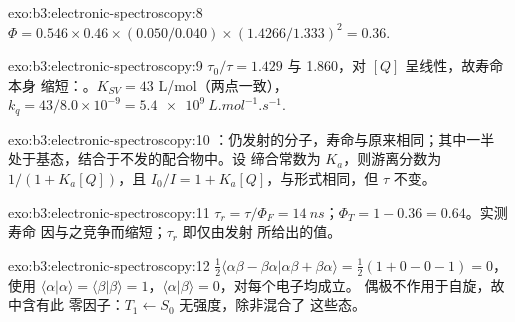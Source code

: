 \begin{solution}{exo:b3:electronic-spectroscopy:8}
$\Phi = 0.546 \times 0.46 \times (0.050/0.040) \times (1.4266/1.333)^2 = 0.36$.
\end{solution}

\begin{solution}{exo:b3:electronic-spectroscopy:9}
$\tau_0/\tau = 1.429$ 与 1.860，对 $[Q]$ 呈线性，故寿命本身
缩短：。$K_{SV} = 43$ L/mol（两点一致），$k_q = 43/8.0
\times 10^{-9} = \qty{5.4e9}{L.mol^{-1}.s^{-1}}$.
\end{solution}

\begin{solution}{exo:b3:electronic-spectroscopy:10}
：仍发射的分子，寿命与原来相同；其中一半
处于基态，结合于不发的配合物中。设
缔合常数为 $K_a$，则游离分数为 $1/(1 + K_a[Q])$，且 $I_0/I = 1 +
K_a[Q]$，与形式相同，但 $\tau$ 不变。
\end{solution}

\begin{solution}{exo:b3:electronic-spectroscopy:11}
$\tau_r = \tau/\Phi_F = \qty{14}{ns}$；$\Phi_T = 1 - 0.36 = 0.64$。实测寿命
因与之竞争而缩短；$\tau_r$ 即仅由发射
所给出的值。
\end{solution}

\begin{solution}{exo:b3:electronic-spectroscopy:12}
$\frac12\langle\alpha\beta - \beta\alpha|\alpha\beta + \beta\alpha\rangle = \frac12(1 + 0 - 0 - 1) = 0$，使用
$\langle\alpha|\alpha\rangle = \langle\beta|\beta\rangle = 1$，$\langle\alpha|\beta\rangle = 0$，对每个电子均成立。
偶极不作用于自旋，故中含有此
零因子：$T_1 \leftarrow S_0$ 无强度，除非混合了
这些态。
\end{solution}

